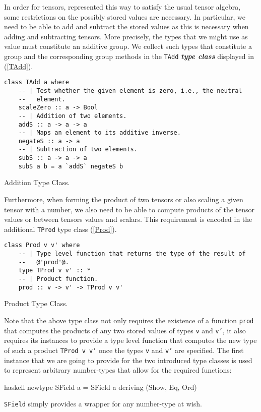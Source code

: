 In order for tensors, represented this way to satisfy the usual tensor algebra, some restrictions on the possibly stored values are necessary. In particular, we need to be able to add and subtract the stored values as this is necessary when adding and subtracting tensors.
More precisely, the types that we might use as value must constitute an additive group. 
We collect such types that constitute a group and the corresponding group methods in the \texttt{TAdd} \textit{\textbf{type class}} displayed in (\ref{TAdd}).

\begin{listing}[hbt!]
\begin{verbatim}
class TAdd a where
    -- | Test whether the given element is zero, i.e., the neutral
    --   element.
    scaleZero :: a -> Bool
    -- | Addition of two elements.
    addS :: a -> a -> a
    -- | Maps an element to its additive inverse.
    negateS :: a -> a
    -- | Subtraction of two elements.
    subS :: a -> a -> a
    subS a b = a `addS` negateS b
\end{verbatim} 
\caption{Addition Type Class.}\label{TAdd}
\end{listing}

Furthermore, when forming the product of two tensors or also scaling a given tensor with a number, we also need to be able to compute products of the tensor values or between tensors values and scalars. This requirement is encoded in the additional \texttt{TProd} type class (\ref{Prod}).

\begin{listing}[hbt!] 
\begin{verbatim}
class Prod v v' where
    -- | Type level function that returns the type of the result of
    --   @'prod'@.
    type TProd v v' :: *
    -- | Product function.
    prod :: v -> v' -> TProd v v'
\end{verbatim} 
\caption{Product Type Class.}\label{Prod}
\end{listing}

Note that the above type class not only requires the existence of a function \texttt{prod} that computes the products of any two stored values of types \texttt{v} and \texttt{v'}, it also requires its instances to provide a type level function that computes the new type of such a product \texttt{TProd v v'} once the types \texttt{v} and \texttt{v'} are specified.
The first instance that we are going to provide for the two introduced type classes is used to represent arbitrary number-types that allow for the required functions:
\begin{center}
\begin{cminted}{haskell}
newtype SField a = SField a deriving (Show, Eq, Ord)
\end{cminted} 
\end{center}
\texttt{SField} simply provides a wrapper for any number-type at wish.

